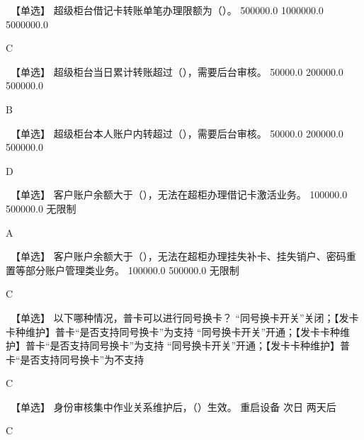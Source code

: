 \documentclass[kindlepaper]{BHCexam4kindle}
\begin{document}
\begin{questions}
\qs　【单选】 超级柜台借记卡转账单笔办理限额为（）。 \xx
{} {  500000.0 } { 1000000.0 } { 5000000.0 }
\begin{solution} C \end{solution}
\qs　【单选】 超级柜台当日累计转账超过（），需要后台审核。 \xx
{} {  50000.0 } { 200000.0 } { 500000.0 }
\begin{solution} B \end{solution}
\qs　【单选】 超级柜台本人账户内转超过（），需要后台审核。 \xx
{} {  50000.0 } { 200000.0 } { 500000.0 }
\begin{solution} D \end{solution}
\qs　【单选】 客户账户余额大于（），无法在超柜办理借记卡激活业务。 \xx
{} {  100000.0 } { 500000.0 } { 无限制 }
\begin{solution} A \end{solution}
\qs　【单选】 客户账户余额大于（），无法在超柜办理挂失补卡、挂失销户、密码重置等部分账户管理类业务。 \xx
{} {  100000.0 } { 500000.0 } { 无限制 }
\begin{solution} C \end{solution}
\qs　【单选】 以下哪种情况，普卡可以进行同号换卡？ \xx
{} {  “同号换卡开关”关闭；【发卡卡种维护】普卡“是否支持同号换卡”为支持 } { “同号换卡开关”开通；【发卡卡种维护】普卡“是否支持同号换卡”为支持 } { “同号换卡开关”开通；【发卡卡种维护】普卡“是否支持同号换卡”为不支持 }
\begin{solution} C \end{solution}
\qs　【单选】 身份审核集中作业关系维护后，（）生效。 \xx
{} {  重启设备 } { 次日 } { 两天后 }
\begin{solution} C \end{solution}

\end{questions}
\end{document}
